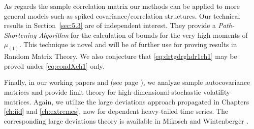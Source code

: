 As regards the sample correlation matrix our methods can be applied to more general models such as spiked covariance/correlation structures. Our technical results in Section~\ref{sec:5.3} are of independent interest. They provide a {\em Path-Shortening Algorithm} for the calculation of bounds for the very high moments of 
$\mu_{(1)}$. This technique is novel and will be of further use for proving results
in Random Matrix Theory.
We also conjecture that \eqref{eq:drtgdrghdr1ch1} may be proved under \eqref{eq:condXch1} only.

Finally, in our working papers \cite{heiny:mikosch:2016:noniid1} and \cite{heiny:mikosch:2016:stochvol1} (see page \pageref{eq:regvarch1}), we analyze  sample autocovariance matrices and provide limit theory for high-dimensional stochastic
volatility matrices.
Again, we utilize the large deviations approach propagated in Chapters \ref{ch:iid} and \ref{ch:extremes}, now for dependent heavy-tailed time series. The corresponding large deviations theory is available in Mikosch and Wintenberger \cite{mikosch:wintenberger:2016}.